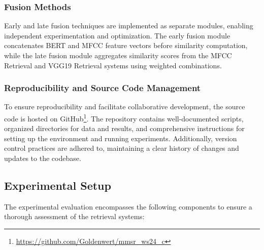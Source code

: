 \documentclass[sigconf]{acmart}
\begin{document}
\subsubsection{Fusion Methods}

Early and late fusion techniques are implemented as separate modules, enabling independent experimentation and optimization. The early fusion module concatenates BERT and MFCC feature vectors before similarity computation, while the late fusion module aggregates similarity scores from the MFCC Retrieval and VGG19 Retrieval systems using weighted combinations.

\subsubsection{Reproducibility and Source Code Management}

To ensure reproducibility and facilitate collaborative development, the source code is hosted on GitHub\footnote{\url{https://github.com/Goldenwert/mmsr_ws24_c}}. The repository contains well-documented scripts, organized directories for data and results, and comprehensive instructions for setting up the environment and running experiments. Additionally, version control practices are adhered to, maintaining a clear history of changes and updates to the codebase.

\subsection{Experimental Setup}
\label{subsec:experimental_setup}

The experimental evaluation encompasses the following components to ensure a thorough assessment of the retrieval systems:
\end{document}
